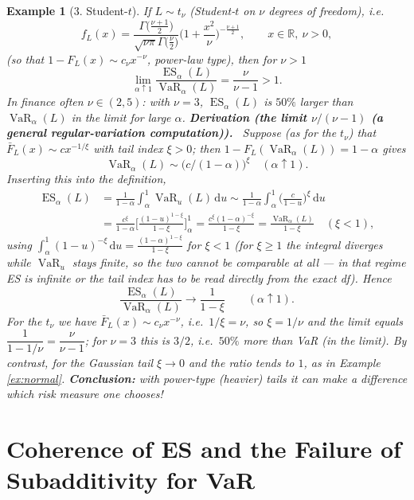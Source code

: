 \documentclass[11pt,a4paper]{article}
\newtheorem{example}{Example}
\newcommand{\VaR}{\operatorname{VaR}}
\newcommand{\ES}{\operatorname{ES}}
\newcommand{\real}{\mathbb{R}}
\newcommand{\dd}{\,\mathrm{d}}
\newcommand{\der}[1]{\medskip\noindent\textbf{Derivation (#1).}\ }
\begin{document}
\begin{example}[3. Student-$t$]\label{ex:t}
If $L\sim t_\nu$ (Student-$t$ on $\nu$ degrees of freedom), i.e.
\[
  f_L(x)=\frac{\Gamma\big(\frac{\nu+1}{2}\big)}{\sqrt{\nu\pi}\Gamma\big(\frac\nu2\big)}
        \Big(1+\frac{x^2}{\nu}\Big)^{-\frac{\nu+1}{2}},\qquad x\in\real,\ \nu>0,
\]
(so that $1-F_L(x)\sim c_\nu x^{-\nu}$, power-law type), then for $\nu>1$
\[
  \lim_{\alpha\uparrow1}\frac{\ES_\alpha(L)}{\VaR_\alpha(L)}=\frac{\nu}{\nu-1}>1 .
\]
In finance often $\nu\in(2,5)$: with $\nu=3$, $\ES_\alpha(L)$ is $50\%$ larger than $\VaR_\alpha(L)$ in
the limit for large $\alpha$.
\der{the limit $\nu/(\nu-1)$ (a general regular-variation computation)}
Suppose (as for the $t_\nu$) that $\bar F_L(x)\sim c x^{-1/\xi}$ with tail index $\xi>0$; then
$1-F_L(\VaR_\alpha(L))=1-\alpha$ gives
\[
  \VaR_\alpha(L)\sim\big(c/(1-\alpha)\big)^{\xi}\quad(\alpha\uparrow1).
\]
Inserting this into the definition,
\begin{align*}
  \ES_\alpha(L)&=\frac{1}{1-\alpha}\int_\alpha^1\VaR_u(L)\dd u
   \sim\frac{1}{1-\alpha}\int_\alpha^1\Big(\frac{c}{1-u}\Big)^{\xi}\dd u\\
   &=\frac{c^{\xi}}{1-\alpha}\Big[\frac{(1-u)^{1-\xi}}{1-\xi}\Big]_{\alpha}^{1}
   =\frac{c^{\xi}(1-\alpha)^{-\xi}}{1-\xi}
   =\frac{\VaR_\alpha(L)}{1-\xi}\quad(\xi<1),
\end{align*}
using $\int_\alpha^1(1-u)^{-\xi}\dd u=\frac{(1-\alpha)^{1-\xi}}{1-\xi}$ for $\xi<1$ (for $\xi\ge1$ the
integral diverges while $\VaR_u$ stays finite, so the two cannot be comparable at all --- in that
regime ES is infinite or the tail index has to be read directly from the exact df). Hence
\[
  \frac{\ES_\alpha(L)}{\VaR_\alpha(L)}\longrightarrow\frac{1}{1-\xi}
  \qquad(\alpha\uparrow1).
\]
For the $t_\nu$ we have $\bar F_L(x)\sim c_\nu x^{-\nu}$, i.e.\ $1/\xi=\nu$, so $\xi=1/\nu$ and the
limit equals $\dfrac{1}{1-1/\nu}=\dfrac{\nu}{\nu-1}$; for \mbox{$\nu=3$} this is $3/2$, i.e.\ $50\%$ more
than VaR (in the limit). By contrast, for the Gaussian tail $\xi\to0$ and the ratio tends to $1$, as in
Example \ref{ex:normal}.
\textbf{Conclusion:} with power-type (heavier) tails it can make a difference which risk measure one
chooses!
\end{example}

\section{Coherence of ES and the Failure of Subadditivity for VaR}
\end{document}
